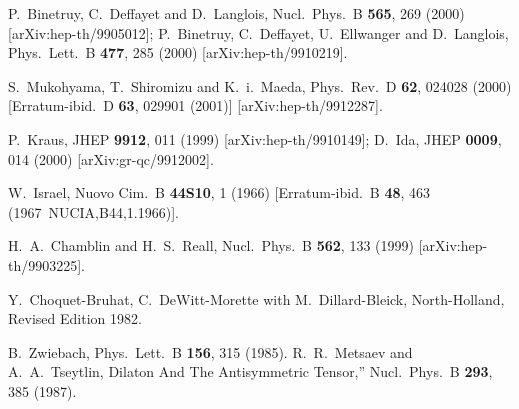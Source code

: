 \documentclass[a4paper,a4paper]{article}
\begin{document}
\begin{thebibliography}{99} 


P.~Binetruy, C.~Deffayet and D.~Langlois,
Nucl.\ Phys.\ B {\bf 565}, 269 (2000)
[arXiv:hep-th/9905012];
P.~Binetruy, C.~Deffayet, U.~Ellwanger and D.~Langlois,
Phys.\ Lett.\ B {\bf 477}, 285 (2000)
[arXiv:hep-th/9910219].


S.~Mukohyama, T.~Shiromizu and K.~i.~Maeda,
Phys.\ Rev.\ D {\bf 62}, 024028 (2000)
[Erratum-ibid.\ D {\bf 63}, 029901 (2001)]
[arXiv:hep-th/9912287].


P.~Kraus,
JHEP {\bf 9912}, 011 (1999)
[arXiv:hep-th/9910149];
D.~Ida,
JHEP {\bf 0009}, 014 (2000)
[arXiv:gr-qc/9912002].


W.~Israel,
Nuovo Cim.\ B {\bf 44S10}, 1 (1966)
[Erratum-ibid.\ B {\bf 48}, 463 (1967\ NUCIA,B44,1.1966)].

H.~A.~Chamblin and H.~S.~Reall,
Nucl.\ Phys.\ B {\bf 562}, 133 (1999)
[arXiv:hep-th/9903225].

Y.~Choquet-Bruhat, C.~DeWitt-Morette with M.~Dillard-Bleick,
North-Holland, Revised Edition 1982.


B.~Zwiebach,
Phys.\ Lett.\ B {\bf 156}, 315 (1985).
R.~R.~Metsaev and A.~A.~Tseytlin,
Dilaton And The Antisymmetric Tensor,''
Nucl.\ Phys.\ B {\bf 293}, 385 (1987).


\end{thebibliography}
\end{document}
